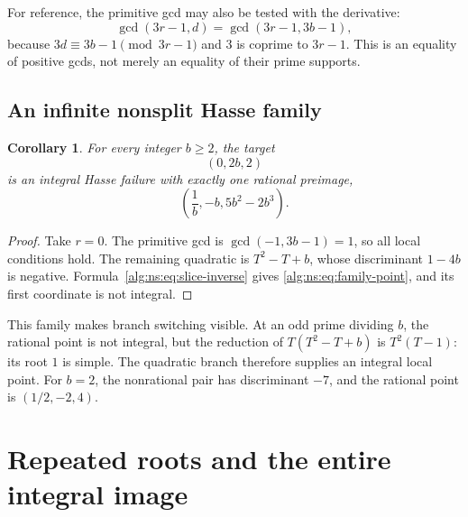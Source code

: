 \documentclass[11pt]{article}
\numberwithin{equation}{section}
\theoremstyle{plain}
\theoremstyle{plain}
\theoremstyle{plain}
\newtheorem{corollary}[corollary]{Corollary}
\theoremstyle{definition}
\theoremstyle{definition}
\theoremstyle{definition}
\theoremstyle{remark}
\begin{document}
For reference, the primitive gcd may also be tested with the derivative:
\begin{equation}\label{alg:ns:eq:gcd-derivative}
\gcd(3r-1,d)=\gcd(3r-1,3b-1),
\end{equation}
because $3d\equiv3b-1\pmod{3r-1}$ and $3$ is coprime to $3r-1$.
This is an equality of positive gcds, not merely an equality of their
prime supports.

\subsection{An infinite nonsplit Hasse family}
\begin{corollary}\label{alg:ns:cor:family}
For every integer $b\ge2$, the target
\begin{equation}\label{alg:ns:eq:family}
(0,2b,2)
\end{equation}
is an integral Hasse failure with exactly one rational preimage,
\begin{equation}\label{alg:ns:eq:family-point}
\left(\frac1b,-b,5b^2-2b^3\right).
\end{equation}
\end{corollary}
\begin{proof}
Take $r=0$. The primitive gcd is $\gcd(-1,3b-1)=1$, so all local
conditions hold. The remaining quadratic is $T^2-T+b$, whose
discriminant $1-4b$ is negative. Formula~\eqref{alg:ns:eq:slice-inverse} gives
\eqref{alg:ns:eq:family-point}, and its first coordinate is not integral.
\end{proof}
This family makes branch switching visible. At an odd prime dividing
$b$, the rational point is not integral, but the reduction of
$T(T^2-T+b)$ is $T^2(T-1)$: its root $1$ is simple. The quadratic branch
therefore supplies an integral local point. For $b=2$, the nonrational
pair has discriminant $-7$, and the rational point is $(1/2,-2,4)$.

\section{Repeated roots and the entire integral image}\label{alg:ns:sec:integral}
\end{document}
